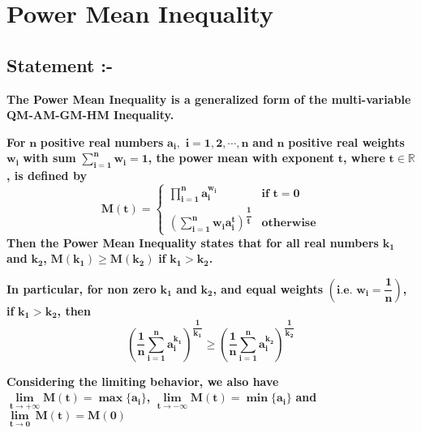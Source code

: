 \documentclass[12pt]{article}
\begin{document}
  \pagebreak 

\section{Power Mean Inequality}

\subsection{Statement :-}
\Large{\textbf{The Power Mean Inequality is a generalized form of the multi-variable QM-AM-GM-HM Inequality.}

\textbf{For }$\boldsymbol{n}$\textbf{ positive real numbers }$\boldsymbol{a_i,}$ $\boldsymbol{i=1,2,\cdots,n}$\textbf{ and }$\boldsymbol{n}$\textbf{ positive real weights }$\boldsymbol{w_i}$\textbf{ with sum }$\boldsymbol{\displaystyle{\sum\limits_{i=1}^n} w_i=1}$\textbf{, the power mean with exponent }$\boldsymbol{t}$\textbf{, where }$\boldsymbol{t\in\mathbb{R}}$\textbf{, is defined by}\[\boldsymbol{M(t)= \begin{cases} \displaystyle{\prod\limits_{i=1}^n }a_i^{w_i} &\text{if } t=0 \\ \left(\displaystyle{\sum\limits_{i=1}^n w_ia_i^t} \right)^{\dfrac{1}{t}} &\text{otherwise} \end{cases}}\]\textbf{Then the Power Mean Inequality states that for all real numbers }$\boldsymbol{k_1}$\textbf{ and }$\boldsymbol{k_2}$\textbf{, }$\boldsymbol{M(k_1)\ge M(k_2)}$\textbf{ if }$\boldsymbol{k_1>k_2}$\textbf{.}

\textbf{In particular, for non zero }$\boldsymbol{k_1}$\textbf{ and }$\boldsymbol{k_2}$\textbf{, and equal weights }$\boldsymbol{\left(\textbf{i.e. }w_i=\dfrac{1}{n}\right)}$\textbf{, if }$\boldsymbol{k_1>k_2}$\textbf{, then}\[\boldsymbol{\left( \frac{1}{n} \sum_{i=1}^n a_{i}^{k_1} \right)^{\dfrac{1}{k_1}}  \ge \left( \frac{1}{n} \sum_{i=1}^n a_{i}^{k_2} \right)^{\dfrac{1}{k_2}}}\]}\textbf{Considering the limiting behavior, we also have }$\boldsymbol{\displaystyle{\lim\limits_{t\to +\infty}} M(t)=\max\{a_i\}}$\textbf{, }\linebreak$\boldsymbol{\displaystyle{\lim\limits_{t\to -\infty}} M(t)=\min\{a_i\}}$\textbf{ and }$\boldsymbol{\displaystyle{\lim\limits_{t\to 0}}\, M(t)= M(0)}$
\end{document}
